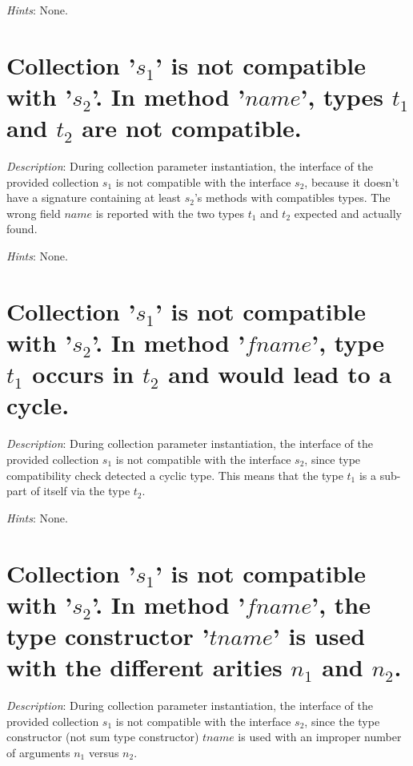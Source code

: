 {\em Hints}: None.

\section*{Collection '$s_1$' is not compatible with '$s_2$'. In method
  '$name$', types $t_1$ and $t_2$ are not compatible.}

{\em Description}: During collection parameter instantiation, the
interface of the provided collection  $s_1$ is not compatible with the
interface  $s_2$, because it doesn't have a signature containing at
least $s_2$'s methods with compatibles types. The wrong field $name$
is reported with the two types $t_1$ and $t_2$ expected and actually
found.

{\em Hints}: None.



\section*{Collection '$s_1$' is not compatible with '$s_2$'. In method
  '$fname$', type $t_1$ occurs in $t_2$ and would lead to a cycle.}

{\em Description}: During collection parameter instantiation, the
interface of the 
provided collection  $s_1$ is not compatible with the interface $s_2$, since type compatibility check detected a cyclic
type. This means that the type $t_1$ is a sub-part of itself via the
type $t_2$.

{\em Hints}: None.



\section*{Collection  '$s_1$' is not compatible with '$s_2$'. In method
  '$fname$', the type constructor '$tname$' is used with the different
  arities $n_1$ and $n_2$.}

{\em Description}:  During collection parameter instantiation, the
interface of the 
provided collection  $s_1$ is not compatible with the interface $s_2$, since the type constructor (not sum type constructor)
$tname$ is used with an improper number of arguments $n_1$ versus
$n_2$.

